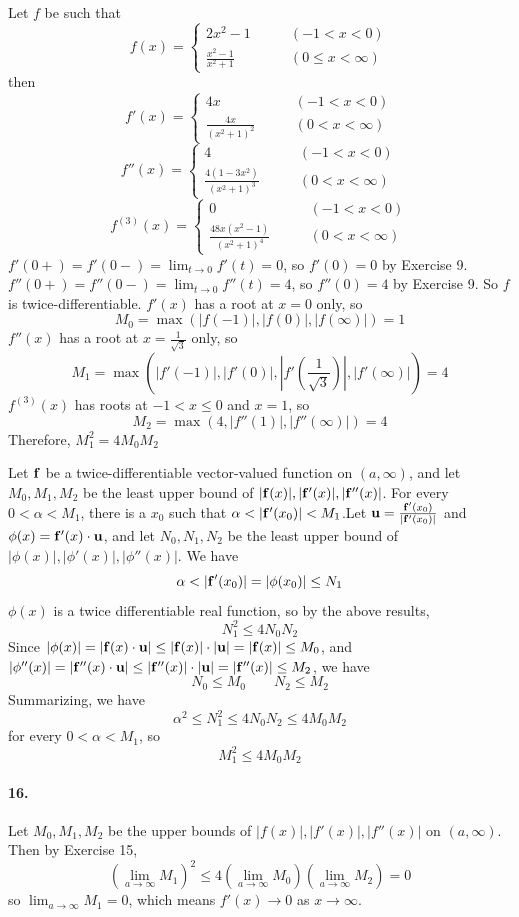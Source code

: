 \documentclass[a4paper]{article}
\begin{document}
Let $f$ be such that
\[
f(x)=\begin{cases}
2x^2-1\qquad & (-1<x<0)\\
\frac{x^2-1}{x^2+1}\qquad & (0\leq x<\infty)
\end{cases}
\]
then
\[
f'(x)=\begin{cases}
4x\qquad & (-1<x<0)\\
\frac{4x}{(x^2+1)^2}\qquad & (0<x<\infty)
\end{cases}
\]
\[
f''(x)=\begin{cases}
4\qquad & (-1<x<0)\\
\frac{4(1-3x^2)}{(x^2+1)^3}\qquad & (0<x<\infty)
\end{cases}
\]
\[
f^{(3)}(x)=\begin{cases}
0\qquad & (-1<x<0)\\
\frac{48x(x^2-1)}{(x^2+1)^4}\qquad & (0<x<\infty)
\end{cases}
\]
$f'(0+)=f'(0-)=\lim_{t\to0}f'(t)=0$, so $f'(0)=0$ by Exercise 9.\; $f''(0+)=f''(0-)=\lim_{t\to0}f''(t)=4$, so $f''(0)=4$ by Exercise 9. So $f$ is twice-differentiable. $f'(x)$ has a root at $x=0$ only, so 
\[
M_0=\max\left(|f(-1)|,|f(0)|,|f(\infty)|\right)=1
\]
$f''(x)$ has a root at $x=\frac{1}{\sqrt{3}}$ only, so
\[
M_1=\max\left(|f'(-1)|,|f'(0)|,|f'(\frac{1}{\sqrt{3}})|,|f'(\infty)|\right)=4
\]
$f^{(3)}(x)$ has roots at $-1<x\leq0$ and $x=1$, so
\[
M_2=\max\left(4,|f''(1)|,|f''(\infty)| \right)=4
\]
Therefore, $M_1^2=4M_0M_2$

Let $\mathbf{f}$ be a twice-differentiable vector-valued function on $(a,\infty)$, and let $M_0,M_1,M_2$ be the least upper bound of $|\mathbf{f}(x)|,|\mathbf{f'}(x)|,|\mathbf{f''}(x)|$. For every $0<\alpha<M_1$, there is a $x_0$ such that $\alpha<|\V{f'}(x_0)|<M_1$.Let $\mathbf{u}=\frac{\mathbf{f'}(x_0)}{|\mathbf{f'}(x_0)|}$ and $\phi(x)=\mathbf{f'}(x)\cdot\mathbf{u}$, and let $N_0,N_1,N_2$ be the least upper bound of $|\phi(x)|,|\phi'(x)|,|\phi''(x)|$. We have
\[
\alpha<|\V{f'}(x_0)|=|\phi(x_0)|\leq N_1
\]
$\phi(x)$ is a twice differentiable real function, so by the above results,
\[
N_1^2\leq4N_0N_2
\]
Since $|\phi(x)|=|\mathbf{f}(x)\cdot\mathbf{u}|\leq|\mathbf{f}(x)|\cdot|\mathbf{u}|=|\mathbf{f}(x)|\leq M_0$, and $|\phi''(x)|=|\mathbf{f''}(x)\cdot\mathbf{u}|\leq|\mathbf{f''}(x)|\cdot|\mathbf{u}|=|\mathbf{f''}(x)|\leq M_2$, we have
\[
N_0\leq M_0\qquad N_2\leq M_2
\]
Summarizing, we have
\[
\alpha^2\leq N_1^2\leq4N_0N_2\leq4M_0M_2
\]
for every $0<\alpha<M_1$, so
\[
M_1^2\leq4M_0M_2
\]

\paragraph{16.}
Let $M_0,M_1,M_2$ be the upper bounds of $|f(x)|,|f'(x)|,|f''(x)|$ on $(a,\infty)$. Then by Exercise 15,
\[
\left(\lim_{a\to\infty}M_1 \right)^2\leq4\left(\lim_{a\to\infty}M_0 \right)\left(\lim_{a\to\infty}M_2 \right)=0
\]
so $\lim_{a\to\infty}M_1=0$, which means $f'(x)\to0$ as $x\to\infty$.
\end{document}
